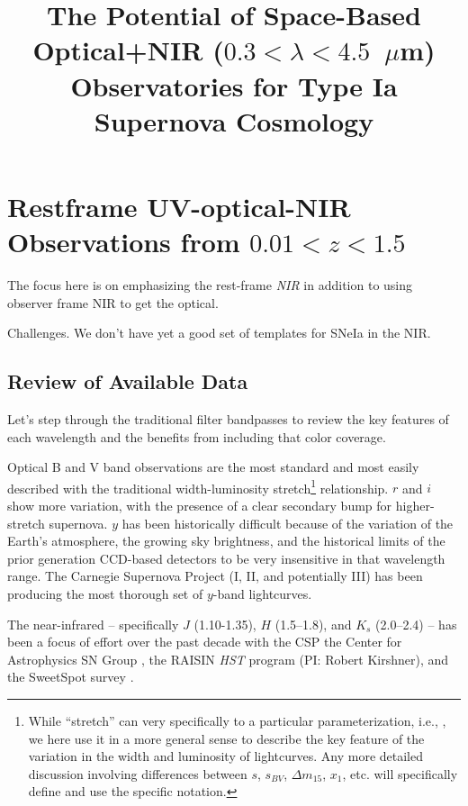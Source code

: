 \title{The Potential of Space-Based Optical+NIR ($0.3<\lambda<4.5$~$\mu$m) Observatories for Type Ia Supernova Cosmology}

\section{Restframe UV-optical-NIR Observations from $0.01<z<1.5$}

The focus here is on emphasizing the rest-frame {\em NIR} in addition to using observer frame NIR to get the optical.

Challenges.  We don't have yet a good set of templates for SNeIa in the NIR.

\subsection{Review of Available Data}
Let's step through the traditional filter bandpasses to review the key features of each wavelength and the benefits from including that color coverage.

Optical B and V band observations are the most standard and most easily described with the traditional width-luminosity stretch\footnote{While ``stretch'' can very specifically to a particular parameterization, i.e., \citet{Goldhaber02}, we here use it in a more general sense to describe the key feature of the variation in the width and luminosity of \snia lightcurves.  Any more detailed discussion involving differences between $s$, $s_{BV}$, $\Delta m_{15}$, $x_1$, etc. will specifically define and use the specific notation.} relationship.  $r$ and $i$ show more variation, with the presence of a clear secondary bump for higher-stretch supernova.  $y$ has been historically difficult because of the variation of the Earth's atmosphere, the growing sky brightness, and the historical limits of the prior generation CCD-based detectors to be very insensitive in that wavelength range.  The Carnegie Supernova Project (I, II, and potentially III) has been producing the most thorough set of $y$-band \snia lightcurves.

The near-infrared -- specifically $J$ (1.10-1.35), $H$ (1.5--1.8), and $K_s$ (2.0--2.4) -- has been a focus of effort over the past decade with the CSP \citep{Contreras11, Krisciunas17, } the Center for Astrophysics SN Group \citep{Wood-Vasey08,Friedman15}, the RAISIN {\it HST} program (PI: Robert Kirshner), and the SweetSpot survey \citep{Weyant14, Weyant17}.

